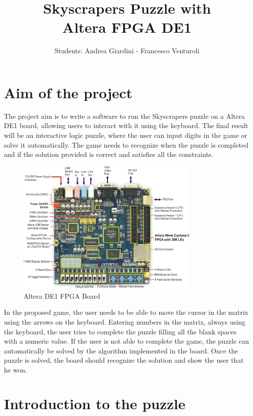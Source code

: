 \documentclass[12pt]{report}
\title{Skyscrapers Puzzle with\\
Altera FPGA DE1}
\date{\vspace{-5ex}}
\begin{document}
\author{Students: Andrea Giardini - Francesco Venturoli}
\maketitle

\chapter*{Aim of the project}

The project aim is to write a software to run the Skyscrapers puzzle on
a Altera DE1 board, allowing users to interact with it using the keyboard.
The final result will be an interactive logic puzzle, where the user can
input digits in the game or solve it automatically. The game needs to
recognize when the puzzle is completed and if the solution provided is
correct and satisfies all the constraints.

\begin{figure}[H]
  \centering
  \includegraphics[keepaspectratio,width=0.8\textwidth]{images/Altera_DE1_Board.jpg}
  \caption{Altera DE1 FPGA Board}
\end{figure}

In the proposed game, the user needs to be able to move the cursor in the
matrix using the arrows on the keyboard. Entering numbers in the matrix,
always using the keyboard, the user tries to complete the puzzle filling
all the blank spaces with a numeric value. If the user is not able to
complete the game, the puzzle can automatically be solved by the
algorithm implemented in the board. Once the puzzle is solved, the board
should recognize the solution and show the user that he won.

\chapter*{Introduction to the puzzle}
\end{document}
